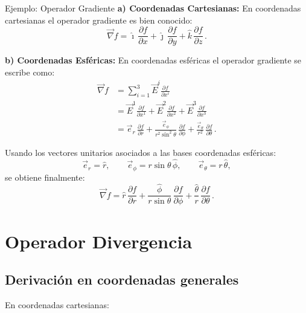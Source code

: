 \documentclass[../apunte_mecanica_clasica.tex]{subfiles}%
\begin{document}
\begin{apuntebloque}{Ejemplo: Operador Gradiente}
\textbf{a) Coordenadas Cartesianas:} En coordenadas cartesianas el operador gradiente es bien conocido:
\begin{equation*}
    \vec{\nabla} f = \hat{\imath}\,\frac{\partial f}{\partial x}
                   + \hat{\jmath}\,\frac{\partial f}{\partial y}
                   + \hat{k}\,\frac{\partial f}{\partial z} \,.
\end{equation*}

\textbf{b) Coordenadas Esféricas:} En coordenadas esféricas el operador gradiente se escribe como:
\begin{align*}
    \vec{\nabla} f &= \sum_{i=1}^3 \vec{E}^i \frac{\partial f}{\partial x^i} \\[4pt]
    &= \vec{E}^1 \frac{\partial f}{\partial x^1}
     + \vec{E}^2 \frac{\partial f}{\partial x^2}
     + \vec{E}^3 \frac{\partial f}{\partial x^3} \\[4pt]
    &= \vec{e}_r \,\frac{\partial f}{\partial r}
     + \frac{\vec{e}_\phi}{r^2 \sin^2\theta}\,\frac{\partial f}{\partial \phi}
     + \frac{\vec{e}_\theta}{r^2}\,\frac{\partial f}{\partial \theta} \,.
\end{align*}

Usando los vectores unitarios asociados a las bases coordenadas esféricas:
\begin{equation*}
    \vec{e}_r = \hat{r}, \qquad
    \vec{e}_\phi = r \sin\theta \,\hat{\phi}, \qquad
    \vec{e}_\theta = r\,\hat{\theta},
\end{equation*}
se obtiene finalmente:
\begin{equation*}
    \vec{\nabla} f = \hat{r}\,\frac{\partial f}{\partial r}
                   + \frac{\hat{\phi}}{r \sin\theta}\,\frac{\partial f}{\partial \phi}
                   + \frac{\hat{\theta}}{r}\,\frac{\partial f}{\partial \theta} \,.
\end{equation*}
\end{apuntebloque}

\section{Operador Divergencia}


\subsection{Derivación en coordenadas generales}

En coordenadas cartesianas:
\end{document}

